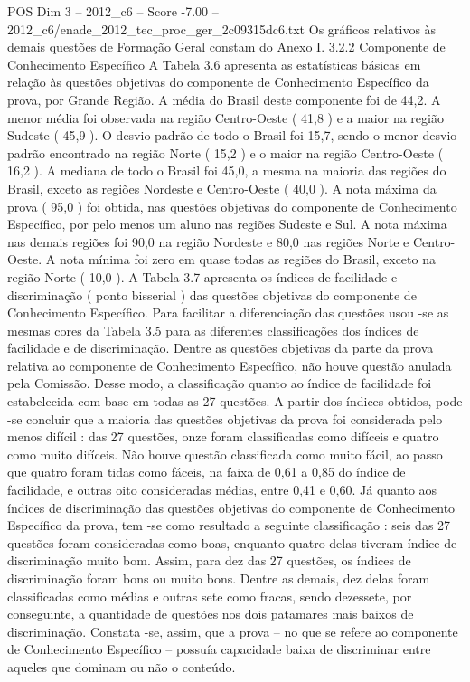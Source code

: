 \begin{textsample}{POS Dim 3 – 2012\_c6 – Score -7.00 – 2012\_c6/enade\_2012\_tec\_proc\_ger\_2c09315dc6.txt}
Os gráficos relativos às demais questões de Formação Geral constam do Anexo I. 3.2.2 Componente de Conhecimento Específico A Tabela 3.6 apresenta as estatísticas básicas em relação às questões objetivas do componente de Conhecimento Específico da prova, por Grande Região.
A média do Brasil deste componente foi de 44,2.
A menor média foi observada na região Centro-Oeste ( 41,8 ) e a maior na região Sudeste ( 45,9 ).
O desvio padrão de todo o Brasil foi 15,7, sendo o menor desvio padrão encontrado na região Norte ( 15,2 ) e o maior na região Centro-Oeste ( 16,2 ).
A mediana de todo o Brasil foi 45,0, a mesma na maioria das regiões do Brasil, exceto as regiões Nordeste e Centro-Oeste ( 40,0 ).
A nota máxima da prova ( 95,0 ) foi obtida, nas questões objetivas do componente de Conhecimento Específico, por pelo menos um aluno nas regiões Sudeste e Sul.
A nota máxima nas demais regiões foi 90,0 na região Nordeste e 80,0 nas regiões Norte e Centro-Oeste.
A nota mínima foi zero em quase todas as regiões do Brasil, exceto na região Norte ( 10,0 ).
A Tabela 3.7 apresenta os índices de facilidade e discriminação ( ponto bisserial ) das questões objetivas do componente de Conhecimento Específico.
Para facilitar a diferenciação das questões usou -se as mesmas cores da Tabela 3.5 para as diferentes classificações dos índices de facilidade e de discriminação.
Dentre as questões objetivas da parte da prova relativa ao componente de Conhecimento Específico, não houve questão anulada pela Comissão.
Desse modo, a classificação quanto ao índice de facilidade foi estabelecida com base em todas as 27 questões.
A partir dos índices obtidos, pode -se concluir que a maioria das questões objetivas da prova foi considerada pelo menos difícil : das 27 questões, onze foram classificadas como difíceis e quatro como muito difíceis.
Não houve questão classificada como muito fácil, ao passo que quatro foram tidas como fáceis, na faixa de 0,61 a 0,85 do índice de facilidade, e outras oito consideradas médias, entre 0,41 e 0,60.
Já quanto aos índices de discriminação das questões objetivas do componente de Conhecimento Específico da prova, tem -se como resultado a seguinte classificação : seis das 27 questões foram consideradas como boas, enquanto quatro delas tiveram índice de discriminação muito bom.
Assim, para dez das 27 questões, os índices de discriminação foram bons ou muito bons.
Dentre as demais, dez delas foram classificadas como médias e outras sete como fracas, sendo dezessete, por conseguinte, a quantidade de questões nos dois patamares mais baixos de discriminação.
Constata -se, assim, que a prova – no que se refere ao componente de Conhecimento Específico – possuía capacidade baixa de discriminar entre aqueles que dominam ou não o conteúdo.

\end{textsample}
